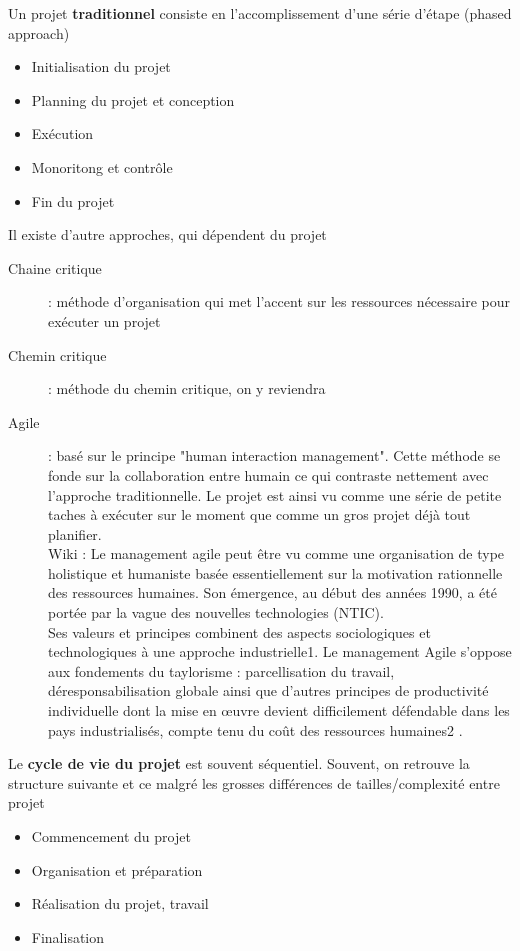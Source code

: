 Un projet \textbf{traditionnel} consiste en l'accomplissement d'une série d'étape (phased approach)
\begin{itemize}
\item Initialisation du projet
\item Planning du projet  et conception
\item Exécution
\item Monoritong et contrôle
\item Fin du projet
\end{itemize}

Il existe d'autre approches, qui dépendent du projet
\begin{description}
\item[Chaine critique] : méthode d'organisation qui met l'accent sur les ressources nécessaire pour exécuter un projet
\item[Chemin critique] : méthode du chemin critique, on y reviendra
\item[Agile] : basé sur le principe "human interaction management". Cette méthode se fonde sur la collaboration entre humain ce qui contraste  nettement avec l'approche traditionnelle. Le projet est ainsi vu comme une série de petite taches à exécuter sur le moment que comme un gros projet déjà tout planifier.\\
Wiki : Le management agile peut être vu comme une organisation de type holistique et humaniste basée essentiellement sur la motivation rationnelle des ressources humaines. Son émergence, au début des années 1990, a été portée par la vague des nouvelles technologies (NTIC).\\

Ses valeurs et principes combinent des aspects sociologiques et technologiques à une approche industrielle1. Le management Agile s’oppose aux fondements du taylorisme : parcellisation du travail, déresponsabilisation globale ainsi que d'autres principes de productivité individuelle dont la mise en œuvre devient difficilement défendable dans les pays industrialisés, compte tenu du coût des ressources humaines2 .
\end{description}

Le \textbf{cycle de vie du projet} est souvent séquentiel. Souvent, on retrouve la structure suivante et ce
malgré les grosses différences de tailles/complexité entre projet
\begin{itemize}
\item Commencement du projet
\item Organisation et préparation
\item Réalisation du projet, travail
\item Finalisation
\end{itemize}



